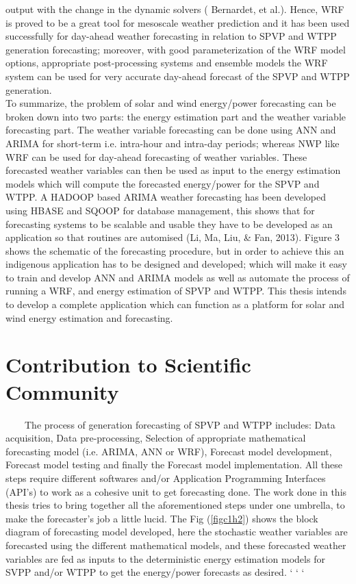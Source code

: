 output with the change in the dynamic solvers ( Bernardet, et al.). Hence, WRF is proved to be a great tool for mesoscale weather prediction and it has been used successfully for day-ahead weather forecasting in relation to SPVP and WTPP generation forecasting; moreover, with good parameterization of the WRF model options, appropriate post-processing systems and ensemble models the WRF system can be used for very accurate day-ahead forecast of the SPVP and WTPP generation.\\

To summarize, the problem of solar and wind energy/power forecasting can be broken down into two parts: the energy estimation part and the weather variable forecasting part. The weather variable forecasting can be done using ANN and ARIMA for short-term i.e. intra-hour and intra-day periods; whereas NWP like WRF can be used for day-ahead forecasting of weather variables. These forecasted weather variables can then be used as input to the energy estimation models which will compute the forecasted energy/power for the SPVP and WTPP. A HADOOP based ARIMA weather forecasting has been developed using HBASE and SQOOP for database management, this shows that for forecasting systems to be scalable and usable they have to be developed as an application so that routines are automised (Li, Ma, Liu, & Fan, 2013). Figure 3 shows the schematic of the forecasting procedure, but in order to achieve this an indigenous application has to be designed and developed; which will make it easy to train and develop ANN and ARIMA models as well as automate the process of running a WRF, and energy estimation of SPVP and WTPP. This thesis intends to develop a complete application which can function as a platform for solar and wind energy estimation and forecasting.


\section{Contribution to Scientific Community}
\
\
\
\
The process of generation forecasting of SPVP and WTPP includes: Data acquisition, Data pre-processing, Selection of appropriate mathematical forecasting model (i.e. ARIMA, ANN or WRF), Forecast model development, Forecast model testing and finally the Forecast model implementation. All these steps require different softwares and/or Application Programming Interfaces (API's) to work as a cohesive unit to get forecasting done. The work done in this thesis tries to bring together all the aforementioned steps under one umbrella, to make the forecaster's job a little lucid. The Fig (\ref{figc1h2}) shows the block diagram of forecasting model developed, here the stochastic weather variables are forecasted using the different mathematical models, and these forecasted weather variables are fed as inputs to the deterministic energy estimation models for SVPP and/or WTPP to get the energy/power forecasts as desired.
`	`																		`  

